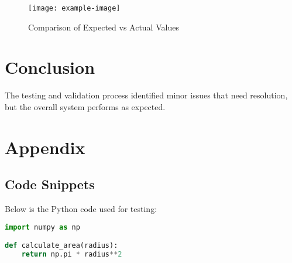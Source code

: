 \documentclass[a4paper,12pt]{article}
\begin{document}
\begin{figure}[h!]
    \centering
    \texttt{[image: example-image]} %
    \caption{Comparison of Expected vs Actual Values}
    \label{fig:example}
\end{figure}

\section{Conclusion}
The testing and validation process identified minor issues that need resolution, but the overall system performs as expected.

\appendix
\section{Appendix}
\subsection{Code Snippets}
Below is the Python code used for testing:

\begin{lstlisting}[language=Python, caption=Sample Python Code]
import numpy as np

def calculate_area(radius):
    return np.pi * radius**2
\end{lstlisting}
\end{document}

